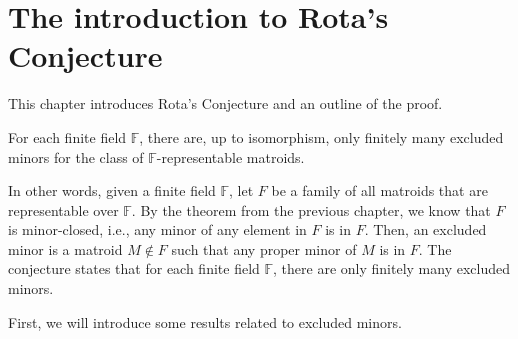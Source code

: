 \section{The introduction to Rota's Conjecture}
This chapter introduces Rota's Conjecture and an outline of the proof.

\begin{conj}
For each finite field $\mathbb{F}$, there are, up to isomorphism, only finitely many excluded minors for the class of $\mathbb{F}$-representable matroids.
\end{conj}

In other words, given a finite field $\mathbb{F}$, let $F$ be a family of all matroids that are representable over $\mathbb{F}$.
By the theorem from the previous chapter, we know that $F$ is minor-closed, i.e., any minor of any element in $F$ is in $F$.
Then, an excluded minor is a matroid $M \notin F$ such that any proper minor of $M$ is in $F$.
The conjecture states that for each finite field $\mathbb{F}$, there are only finitely many excluded minors.

First, we will introduce some results related to excluded minors.

